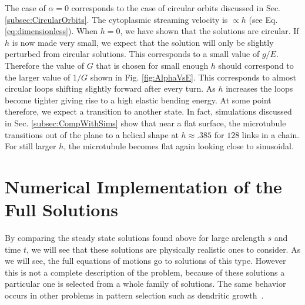 \documentclass[11pt]{ucthesis}
\begin{document}
The case of $\alpha = 0$
corresponds to the case of circular orbits discussed in Sec.  \ref{subsec:CircularOrbits}. 
The cytoplasmic streaming velocity is $\propto h$ (see Eq.  \ref{eq:dimensionless}).
When $h = 0$, we have shown that the solutions are circular. If $h$ is now made very
small, we expect that the solution will only be slightly perturbed from circular
solutions. This corresponds to a small value of $g/E$. Therefore the value of
$G$ that is chosen for small enough $h$ should correspond to the larger value of
$1/G$ shown in Fig.  \ref{fig:AlphaVsE}. This corresponds to almost circular loops
shifting slightly forward after every turn. As $h$ increases the loops become
tighter giving rise to a high elastic bending energy. At some point therefore, 
we expect a transition to another state. In fact, simulations discussed in Sec. \ref{subsec:CompWithSims} show that near a
flat surface, the microtubule transitions out of the plane to a helical shape 
at $h \approx .385$ for $128$ links in a chain. For
still larger $h$, the microtubule becomes flat again looking close to sinusoidal.

\section{Numerical Implementation of the Full Solutions}

By comparing the steady state solutions found above for large arclength $s$ and  time $t$, we will
see that these solutions are physically realistic ones to consider. As we will see, the full
equations of motions go to solutions of this type. However this is not a complete
description of the problem, because of these solutions
a particular one is selected from a whole family of solutions. The same behavior occurs
in other problems in pattern selection such as dendritic growth~\cite{Kessler,Barbieri}.
\end{document}
